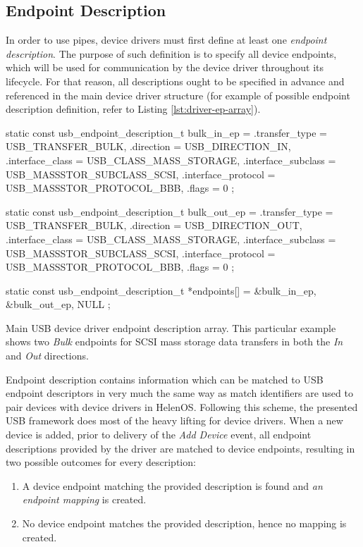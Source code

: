 \subsection{Endpoint Description}

In order to use pipes, device drivers must first define at least one
\textit{endpoint description}. The purpose of such definition is to specify all
device endpoints, which will be used for communication by the device driver
throughout its lifecycle. For that reason, all descriptions ought to be
specified in advance and referenced in the main device driver structure (for
example of possible endpoint description definition, refer to Listing
\ref{lst:driver-ep-array}).

\begin{listing}
	\begin{code}
		static const usb_endpoint_description_t bulk_in_ep = {
			.transfer_type = USB_TRANSFER_BULK,
			.direction = USB_DIRECTION_IN,
			.interface_class = USB_CLASS_MASS_STORAGE,
			.interface_subclass = USB_MASSSTOR_SUBCLASS_SCSI,
			.interface_protocol = USB_MASSSTOR_PROTOCOL_BBB,
			.flags = 0
		};

		static const usb_endpoint_description_t bulk_out_ep = {
			.transfer_type = USB_TRANSFER_BULK,
			.direction = USB_DIRECTION_OUT,
			.interface_class = USB_CLASS_MASS_STORAGE,
			.interface_subclass = USB_MASSSTOR_SUBCLASS_SCSI,
			.interface_protocol = USB_MASSSTOR_PROTOCOL_BBB,
			.flags = 0
		};

		static const usb_endpoint_description_t *endpoints[] = {
			&bulk_in_ep, &bulk_out_ep, NULL
		};
	\end{code}
	\caption[Main USB device driver endpoint description array]{Main USB device
	driver endpoint description array. This particular example shows two
	\textit{Bulk} endpoints for SCSI mass storage data transfers in both the
	\textit{In} and \textit{Out} directions.}
	\label{lst:driver-ep-array}
\end{listing}

Endpoint description contains information which can be matched to USB endpoint
descriptors in very much the same way as match identifiers are used to pair
devices with device drivers in HelenOS. Following this scheme, the presented USB
framework does most of the heavy lifting for device drivers. When a new device
is added, prior to delivery of the \textit{Add Device} event, all endpoint
descriptions provided by the driver are matched to device endpoints, resulting
in two possible outcomes for every description:
~
\begin{enumerate}
	\item A device endpoint matching the provided description is found and
		\textit{an endpoint mapping} is created.
	\item No device endpoint matches the provided description, hence no mapping is
		created.
\end{enumerate}

